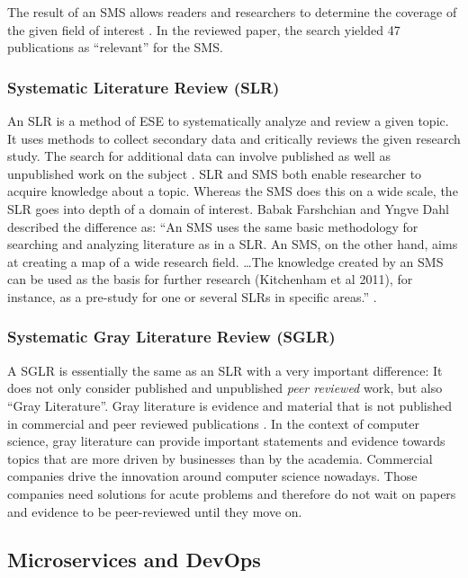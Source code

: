 The result of an SMS allows readers and researchers to determine the coverage of the given
field of interest \cite{petersen:SMS}. In the reviewed paper, the search yielded 47
publications as ``relevant'' for the SMS.

\subsubsection{Systematic Literature Review (SLR)}

An SLR is a method of ESE to systematically analyze and review a given topic. It uses
methods to collect secondary data and critically reviews the given research study.
The search for additional data can involve published as well as unpublished work
on the subject \cite{siddaway:SLR}. SLR and SMS both enable researcher to acquire
knowledge about a topic. Whereas the SMS does this on a wide scale, the SLR
goes into depth of a domain of interest. Babak Farshchian and Yngve Dahl described
the difference as: ``An SMS uses the same basic methodology for searching and 
analyzing literature as in a SLR. An SMS, on the other hand, aims at
creating a map of a wide research field. \dots The knowledge created by an SMS can be
used as the basis for further research (Kitchenham et al 2011),
for instance, as a pre-study for one or several
SLRs in specific areas.'' \cite{farshchian:SMSvsSLR}.

\subsubsection{Systematic Gray Literature Review (SGLR)}

A SGLR is essentially the same as an SLR with a very important difference:
It does not only consider published and unpublished \textit{peer reviewed} work,
but also ``Gray Literature''. Gray literature is evidence and material that
is not published in commercial and peer reviewed publications \cite{paez:GrayLiterature}.
In the context of computer science, gray literature can provide important statements
and evidence towards topics that are more driven by businesses than by the academia.
Commercial companies drive the innovation around computer science nowadays. 
Those companies need solutions for acute problems and therefore do not wait on papers and evidence
to be peer-reviewed until they move on.

\subsection{Microservices and DevOps}

